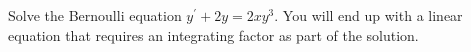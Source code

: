 \documentclass[12pt,letterpaper, onecolumn]{exam}
\begin{document}
\begin{questions}
    \pagebreak %
\thispagestyle{empty}   %
    
    \question[4 Marks] Solve the Bernoulli equation $y^{'} + 2y = 2xy^3$. You will end up with a linear equation that requires an integrating factor as part of the solution.\droppoints
    
    \begin{solution}
        \\
        \\
        \\
        \\
        \\
        \\
        \\
        \\
        \\
        \\
        \\
        \\
        \\
        \\
        \\
        \\
        \\
        \\
        \\
        \\
        \\
        \\
        \\
        \\
        \\
        \\
        \\
        \\
        \\
        \\
        \\
        \\
        \\
        \\
        \\
        \\
        \\
    \end{solution}
    
\end{questions}
\end{document}
